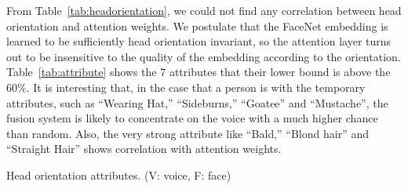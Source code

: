 \documentclass{article}
\newcommand{\sscm}[1]{\textcolor{blue}{[#1 --SS]}}
\begin{document}
From Table~\ref{tab:headorientation}, we could not find any correlation between head orientation and attention weights. We postulate that the FaceNet embedding is learned to be sufficiently head orientation invariant, so the attention layer turns out to be insensitive to the quality of the embedding according to the orientation. Table~\ref{tab:attribute} shows the 7 attributes that their lower bound is above the 60\%. It is interesting that, in the case that a person is with the temporary attributes, such as ``Wearing Hat,'' ``Sideburns,'' ``Goatee'' and ``Mustache'', the fusion system is likely to concentrate on the voice with a much higher chance than random. 
Also, the very strong attribute like ``Bald,'' ``Blond hair'' and ``Straight Hair'' shows correlation with attention weights.
\centering
\begin{subtable}[ht]{1\linewidth}
\centering
{}
\caption{Head orientation attributes. (V: voice, F: face)}
\label{tab:headorientation}
\end{subtable}
\vspace{5pt}
\end{document}
